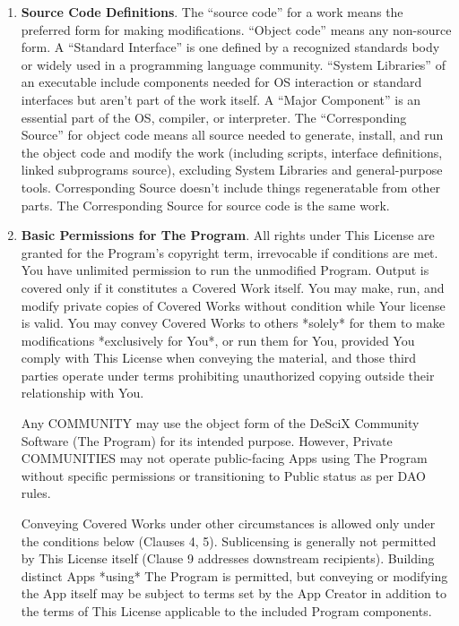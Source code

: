 \documentclass{article}
\begin{document}
    \begin{enumerate}
        \item \textbf{Source Code Definitions}.
        The “source code” for a work means the preferred form for making modifications. “Object code” means any non-source form. A “Standard Interface” is one defined by a recognized standards body or widely used in a programming language community. “System Libraries” of an executable include components needed for OS interaction or standard interfaces but aren't part of the work itself. A “Major Component” is an essential part of the OS, compiler, or interpreter. The “Corresponding Source” for object code means all source needed to generate, install, and run the object code and modify the work (including scripts, interface definitions, linked subprograms source), excluding System Libraries and general-purpose tools. Corresponding Source doesn't include things regeneratable from other parts. The Corresponding Source for source code is the same work.

        \item \textbf{Basic Permissions for The Program}.
        All rights under This License are granted for the Program's copyright term, irrevocable if conditions are met. You have unlimited permission to run the unmodified Program. Output is covered only if it constitutes a Covered Work itself. You may make, run, and modify private copies of Covered Works without condition while Your license is valid. You may convey Covered Works to others *solely* for them to make modifications *exclusively for You*, or run them for You, provided You comply with This License when conveying the material, and those third parties operate under terms prohibiting unauthorized copying outside their relationship with You.

        Any COMMUNITY may use the object form of the DeSciX Community Software (The Program) for its intended purpose. However, Private COMMUNITIES may not operate public-facing Apps using The Program without specific permissions or transitioning to Public status as per DAO rules.

        Conveying Covered Works under other circumstances is allowed only under the conditions below (Clauses 4, 5). Sublicensing is generally not permitted by This License itself (Clause 9 addresses downstream recipients). Building distinct Apps *using* The Program is permitted, but conveying or modifying the App itself may be subject to terms set by the App Creator in addition to the terms of This License applicable to the included Program components.


\end{enumerate}
\end{document}

